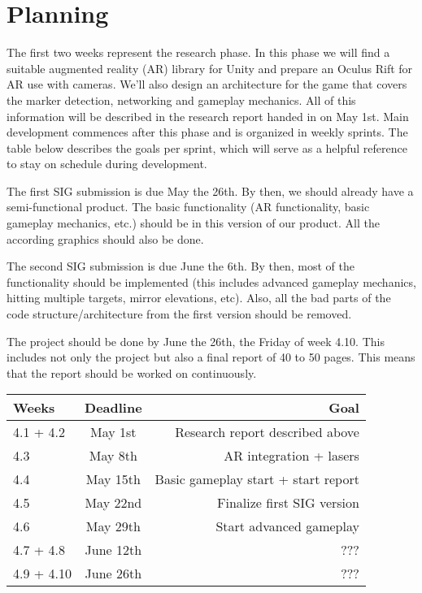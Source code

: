 \section{Planning}

The first two weeks represent the research phase. In this phase we will find a suitable augmented reality (AR) library for Unity and prepare an Oculus Rift for AR use with cameras. We'll also design an architecture for the game that covers the marker detection, networking and gameplay mechanics. All of this information will be described in the research report handed in on May 1st. Main development commences after this phase and is organized in weekly sprints. The table below describes the goals per sprint, which will serve as a helpful reference to stay on schedule during development.

The first SIG submission is due May the 26th. By then, we should already have a semi-functional product. The basic functionality (AR functionality, basic gameplay mechanics, etc.) should be in this version of our product. All the according graphics should also be done.

The second SIG submission is due June the 6th. By then, most of the functionality should be implemented (this includes advanced gameplay mechanics, hitting multiple targets, mirror elevations, etc). Also, all the bad parts of the code structure/architecture from the first version should be removed.

The project should be done by June the 26th, the Friday of week 4.10. This includes not only the project but also a final report of 40 to 50 pages. This means that the report should be worked on continuously.
 
\begin{tabular}{|l|c|r|}
	\hline
	Weeks      & Deadline  & Goal \\ \hline
	4.1 + 4.2  & May 1st   & Research report described above \\ \hline
	4.3        & May 8th   & AR integration + lasers \\ \hline
	4.4        & May 15th  & Basic gameplay start + start report \\ \hline
	4.5        & May 22nd  & Finalize first SIG version \\ \hline
	4.6        & May 29th  & Start advanced gameplay \\ \hline
	4.7 + 4.8  & June 12th & ??? \\ \hline
	4.9 + 4.10 & June 26th & ??? \\ \hline
\end{tabular}

